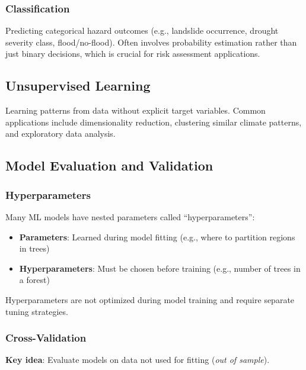 \documentclass[
  letterpaper,
  DIV=11,
  numbers=noendperiod]{scrreprt}
\providecommand{\tightlist}{%
  \setlength{\itemsep}{0pt}\setlength{\parskip}{0pt}}
\begin{document}
\subsubsection{Classification}\label{classification}

Predicting categorical hazard outcomes (e.g., landslide occurrence,
drought severity class, flood/no-flood). Often involves probability
estimation rather than just binary decisions, which is crucial for risk
assessment applications.

\subsection{Unsupervised Learning}\label{unsupervised-learning}

Learning patterns from data without explicit target variables. Common
applications include dimensionality reduction, clustering similar
climate patterns, and exploratory data analysis.

\subsection{Model Evaluation and
Validation}\label{model-evaluation-and-validation}

\subsubsection{Hyperparameters}\label{hyperparameters}

Many ML models have nested parameters called ``hyperparameters'':

\begin{itemize}
\tightlist
\item
  \textbf{Parameters}: Learned during model fitting (e.g., where to
  partition regions in trees)
\item
  \textbf{Hyperparameters}: Must be chosen before training (e.g., number
  of trees in a forest)
\end{itemize}

Hyperparameters are not optimized during model training and require
separate tuning strategies.

\subsubsection{Cross-Validation}\label{cross-validation}

\textbf{Key idea}: Evaluate models on data not used for fitting
(\emph{out of sample}).
\end{document}
